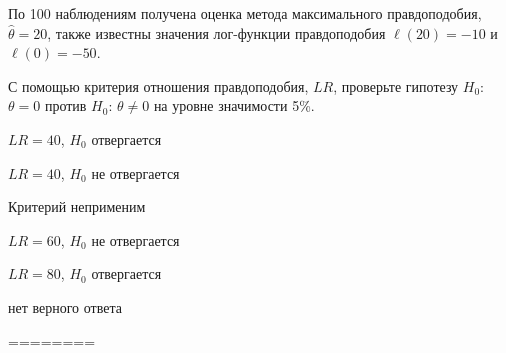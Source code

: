 
\begin{question}
По 100 наблюдениям получена оценка метода максимального правдоподобия,
\(\hat\theta = 20\), также известны значения лог-функции правдоподобия
\(\ell(20) = -10\) и \(\ell(0)= - 50\).

С помощью критерия отношения правдоподобия, \(LR\), проверьте гипотезу
\(H_0\): \(\theta = 0\) против \(H_0\): \(\theta \neq 0\) на уровне
значимости 5\%.
\begin{answerlist}
  \item \(LR = 40\), \(H_0\) отвергается
  \item \(LR = 40\), \(H_0\) не отвергается
  \item Критерий неприменим
  \item \(LR = 60\), \(H_0\) не отвергается
  \item \(LR = 80\), \(H_0\) отвергается
  \item нет верного ответа
\end{answerlist}
\end{question}

\begin{solution}
========
\end{solution}

